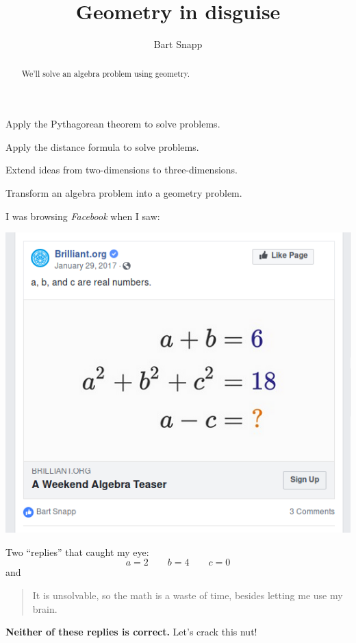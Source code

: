 \documentclass[noauthor,nooutcomes,handout]{ximera}
\title{Geometry in disguise}
\author{Bart Snapp}
\begin{document}
\begin{abstract}
  We'll solve an algebra problem using geometry.
\end{abstract}
\maketitle

\begin{listOutcomes}
\item Apply the Pythagorean theorem to solve problems.
\item Apply the distance formula to solve problems.
\item Extend ideas from two-dimensions to three-dimensions.
\item Transform an algebra problem into a geometry problem.
\end{listOutcomes}

I was browsing \textsl{Facebook} when I saw:
\begin{center}
  \includegraphics[width=.6\textwidth]{fbQuestion.png}
\end{center}


Two ``replies'' that caught my eye:
\[
a = 2\qquad b=4\qquad c=0
\]
and
\begin{quote}
  It is unsolvable, so the math is a waste of time, besides letting
  me use my brain.
\end{quote}
\textbf{Neither of these replies is correct.} Let's crack this nut!


\mynewpage
  
\end{document}
